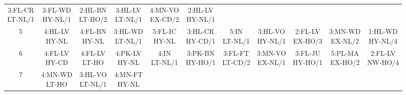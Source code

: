 \begin{table}[htbp]
{\begin{minipage}{0.9\textwidth}
\begin{tabular}{c|cccccccccc}
    \parbox{\cellwidth}{3:FL-CR\\LT-NL/1} & 
    \parbox{\cellwidth}{3:FL-WD\\HY-NL/1} & 
    \parbox{\cellwidth}{2:HL-BN\\LT-HO/2} & 
    \parbox{\cellwidth}{3:HL-LV\\LT-NL/1} & 
    \parbox{\cellwidth}{4:MN-VO\\EX-CD/2} & 
    \parbox{\cellwidth}{2:HL-LV\\HY-NL/1}\\[\extralinespace]
    5 & 
    \parbox{\cellwidth}{4:HL-LV\\HY-NL} & 
    \parbox{\cellwidth}{4:FL-BN\\HY-NL} & 
    \parbox{\cellwidth}{3:HL-WD\\LT-NL/1} & 
    \parbox{\cellwidth}{5:FL-IC\\HY-NL} & 
    \parbox{\cellwidth}{3:HL-CR\\HY-CD/1} & 
    \parbox{\cellwidth}{5:IN\\LT-NL/1} & 
    \parbox{\cellwidth}{3:HL-VO\\HY-NL/1} & 
    \parbox{\cellwidth}{2:FL-LV\\EX-HO/3} & 
    \parbox{\cellwidth}{3:MN-WD\\EX-NL/2} & 
    \parbox{\cellwidth}{1:HL-WD\\HY-NL/4}\\[\extralinespace]
    6 & 
    \parbox{\cellwidth}{4:FL-LV\\HY-CD} & 
    \parbox{\cellwidth}{4:FL-LV\\LT-HO} & 
    \parbox{\cellwidth}{4:PK-LV\\HY-NL} & 
    \parbox{\cellwidth}{4:IN\\LT-NL/1} & 
    \parbox{\cellwidth}{3:PK-BN\\HY-HO/1} & 
    \parbox{\cellwidth}{3:FL-FT\\LT-CD/2} & 
    \parbox{\cellwidth}{3:MN-VO\\EX-NL/1} & 
    \parbox{\cellwidth}{3:FL-JU\\HY-HO/1} & 
    \parbox{\cellwidth}{5:PL-MA\\EX-HO/2} & 
    \parbox{\cellwidth}{2:FL-LV\\NW-HO/4}\\[\extralinespace]
    7 & 
    \parbox{\cellwidth}{4:MN-WD\\LT-HO} & 
    \parbox{\cellwidth}{3:HL-VO\\LT-NL/1} & 
    \parbox{\cellwidth}{4:MN-FT\\HY-NL} & 

\end{tabular}
\end{minipage}}
\end{table}
